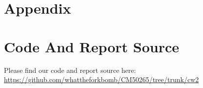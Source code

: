 
\section*{\Large Appendix}
\appendix

\section{Code And Report Source}
Please find our code and report source here: \url{https://github.com/whattheforkbomb/CM50265/tree/trunk/cw2}

